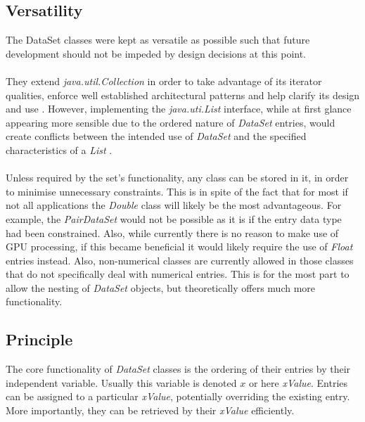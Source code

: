 \documentclass[main.tex]{subfiles}
\begin{document}
    \subsection{Versatility}
    
      The DataSet classes were kept as versatile as possible such that future development should not be impeded by design decisions at this point. 
      \\\\
      They extend \textit{java.util.Collection} in order to take advantage of its iterator qualities, enforce well established architectural patterns and help clarify its design and use \cite{javaCollection}. However, implementing the \textit{java.uti.List} interface, while at first glance appearing more sensible due to the ordered nature of \textit{DataSet} entries, would create conflicts between the intended use of \textit{DataSet} and the specified characteristics of a \textit{List} \cite{javaList}.
      \\\\
      Unless required by the set's functionality, any class can be stored in it, in order to minimise unnecessary constraints. This is in spite of the fact that for most if not all applications the \textit{Double} class will likely be the most advantageous. For example, the \textit{PairDataSet} would not be possible as it is if the entry data type had been constrained. Also, while currently there is no reason to make use of GPU processing, if this became beneficial it would likely require the use of \textit{Float} entries instead. Also, non-numerical classes are currently allowed in those classes that do not specifically deal with numerical entries. This is for the most part to allow the nesting of \textit{DataSet} objects, but theoretically offers much more functionality.
    
    \subsection{Principle}
      \label{sec:impl:dataPrinciple}
      
      The core functionality of \textit{DataSet} classes is the ordering of their entries by their independent variable. Usually this variable is denoted $x$ or here \textit{xValue}. Entries can be assigned to a particular \textit{xValue}, potentially overriding the existing entry. More importantly, they can be retrieved by their \textit{xValue} efficiently. 
      
\end{document}
